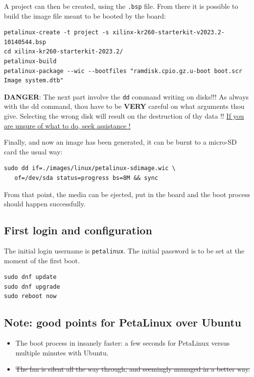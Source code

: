 \documentclass[10pt]{article}
\begin{document}
A project can then be created, using the \texttt{.bsp} file. From there it is possible to
build the image file meant to be booted by the board:
\begin{verbatim}
petalinux-create -t project -s xilinx-kr260-starterkit-v2023.2-10140544.bsp
cd xilinx-kr260-starterkit-2023.2/
petalinux-build
petalinux-package --wic --bootfiles "ramdisk.cpio.gz.u-boot boot.scr Image system.dtb"
\end{verbatim}

\begin{tcolorbox}[colback=red!5!white,colframe=red!75!black]
\textbf{DANGER}: The next part involve the \texttt{dd} command writing on disks!!!
As always with the dd command, thou have to be \textbf{VERY} careful on what arguments
thou give. Selecting the wrong disk will result on the destruction of
thy data !!
\uline{If you are unsure of what to do, seek assistance !}
\end{tcolorbox}

Finally, and now an image has been generated, it can be burnt to a micro-SD card the usual way:
\begin{verbatim}
sudo dd if=./images/linux/petalinux-sdimage.wic \
   of=/dev/sda status=progress bs=8M && sync
\end{verbatim}

From that point, the media can be ejected, put in the board and the boot process
should happen successfully.

\subsection{First login and configuration}
\label{sec:orga9b9dcd}
The initial login username is \texttt{petalinux}. The initial password is to be set at the moment of the first boot.


\begin{verbatim}
sudo dnf update
sudo dnf upgrade
sudo reboot now
\end{verbatim}


\subsection{Note: good points for PetaLinux over Ubuntu}
\label{sec:orgca5e9ed}
\begin{itemize}
\item The boot process in insanely faster: a few seconds for PetaLinux versus multiple minutes with Ubuntu.
\item \sout{The fan is silent all the way through, and seemingly managed in a better way.}
\end{itemize}
\end{document}
